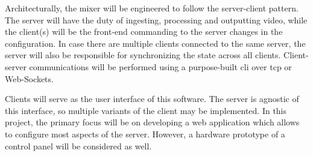 \documentclass[../main.tex]{subfiles}
\begin{document}
Architecturally, the mixer will be engineered to follow the server-client pattern. The server will have the duty of ingesting, processing and outputting video, while the client(s) will be the front-end commanding to the server changes in the configuration. In case there are multiple clients connected to the same server, the server will also be responsible for synchronizing the state across all clients. Client-server communications will be performed using a purpose-built \gls{cli} over \gls{tcp} or Web-Sockets.\newline

Clients will serve as the user interface of this software. The server is agnostic of this interface, so multiple variants of the client may be implemented. In this project, the primary focus will be on developing a web application which allows to configure most aspects of the server. However, a hardware prototype of a control panel will be considered as well.\newline

\end{document}
